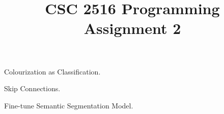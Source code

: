 \documentclass{myhw}
\title{CSC 2516 Programming Assignment 2}
\begin{document}
\begin{homeworkProblem}
Colourization as Classification.
\begin{homeworkSection}

\end{homeworkSection}
\end{homeworkProblem}


\begin{homeworkProblem}
Skip Connections.
\begin{homeworkSection}

\end{homeworkSection}
\begin{homeworkSection}

\end{homeworkSection}
\end{homeworkProblem}


\begin{homeworkProblem}
Fine-tune Semantic Segmentation Model.
\begin{homeworkSection}

\end{homeworkSection}
\begin{homeworkSection}

\end{homeworkSection}
\end{homeworkProblem}
\end{document}
